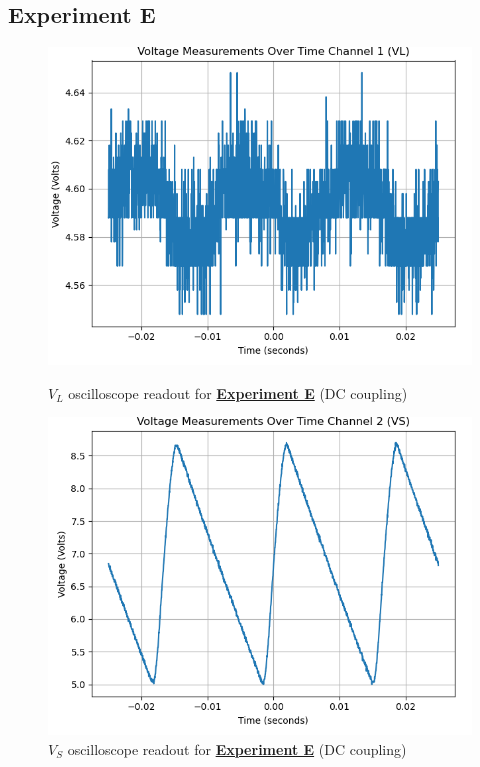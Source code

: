 \documentclass[
	letterpaper
	12pt
]{template}
\newcommand{\bref}[2]{\textbf{\hyperref[#1]{#2}}}
\begin{document}
\subsection{Experiment E}
\begin{figure}[H]\label{data::E}
	\centering
	\begin{minipage}[c]{0.45\textwidth}
		\centering
		\includegraphics[width=\textwidth]{figures/E/1--ch1.png}
	    \caption{$V_{L}$ oscilloscope readout for \bref{exp::E}{Experiment E} (DC coupling)}
	\end{minipage}
	\hfill
	\begin{minipage}[c]{0.45\textwidth}
		\centering
		\includegraphics[width=\textwidth]{figures/E/1--ch2.png}
	    \caption{$V_{S}$ oscilloscope readout for \bref{exp::E}{Experiment E} (DC coupling)}
	\end{minipage}
\end{figure}
\end{document}
